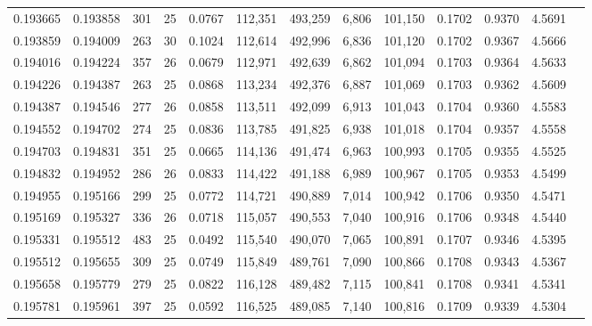 \begin{tabular}{rrrrrrrrrrrrr}
0.193665 & 0.193858 &   301 &  25 &                                     0.0767 & 112,351 & 493,259 &   6,806 & 101,150 & 0.1702 & 0.9370 & 4.5691 \\
0.193859 & 0.194009 &   263 &  30 &                                     0.1024 & 112,614 & 492,996 &   6,836 & 101,120 & 0.1702 & 0.9367 & 4.5666 \\
0.194016 & 0.194224 &   357 &  26 &                                     0.0679 & 112,971 & 492,639 &   6,862 & 101,094 & 0.1703 & 0.9364 & 4.5633 \\
0.194226 & 0.194387 &   263 &  25 &                                     0.0868 & 113,234 & 492,376 &   6,887 & 101,069 & 0.1703 & 0.9362 & 4.5609 \\
0.194387 & 0.194546 &   277 &  26 &                                     0.0858 & 113,511 & 492,099 &   6,913 & 101,043 & 0.1704 & 0.9360 & 4.5583 \\
0.194552 & 0.194702 &   274 &  25 &                                     0.0836 & 113,785 & 491,825 &   6,938 & 101,018 & 0.1704 & 0.9357 & 4.5558 \\
0.194703 & 0.194831 &   351 &  25 &                                     0.0665 & 114,136 & 491,474 &   6,963 & 100,993 & 0.1705 & 0.9355 & 4.5525 \\
0.194832 & 0.194952 &   286 &  26 &                                     0.0833 & 114,422 & 491,188 &   6,989 & 100,967 & 0.1705 & 0.9353 & 4.5499 \\
0.194955 & 0.195166 &   299 &  25 &                                     0.0772 & 114,721 & 490,889 &   7,014 & 100,942 & 0.1706 & 0.9350 & 4.5471 \\
0.195169 & 0.195327 &   336 &  26 &                                     0.0718 & 115,057 & 490,553 &   7,040 & 100,916 & 0.1706 & 0.9348 & 4.5440 \\
0.195331 & 0.195512 &   483 &  25 &                                     0.0492 & 115,540 & 490,070 &   7,065 & 100,891 & 0.1707 & 0.9346 & 4.5395 \\
0.195512 & 0.195655 &   309 &  25 &                                     0.0749 & 115,849 & 489,761 &   7,090 & 100,866 & 0.1708 & 0.9343 & 4.5367 \\
0.195658 & 0.195779 &   279 &  25 &                                     0.0822 & 116,128 & 489,482 &   7,115 & 100,841 & 0.1708 & 0.9341 & 4.5341 \\
0.195781 & 0.195961 &   397 &  25 &                                     0.0592 & 116,525 & 489,085 &   7,140 & 100,816 & 0.1709 & 0.9339 & 4.5304 \\

\end{tabular}
